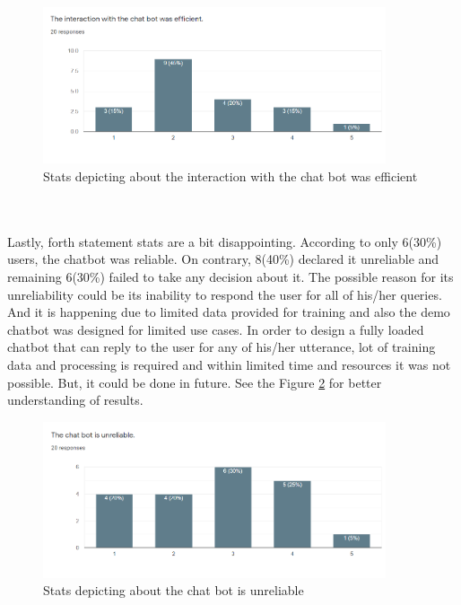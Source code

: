 \begin{figure}[!h]
    \centering
    \includegraphics[width=0.9\textwidth]{img/Efficient_Inter.PNG}
    \caption{Stats depicting about the interaction with the chat bot was efficient}
    \label{fig:effInt}
\end{figure}
\\~\\
Lastly, forth statement stats are a bit disappointing. According to only 6(30\%) users, the chatbot was reliable. On contrary, 8(40\%) declared it unreliable and remaining 6(30\%) failed to take any decision about it. The possible reason for its unreliability could be its inability to respond the user for all of his/her queries. And it is happening due to limited data provided for training and also the demo chatbot was designed for limited use cases. In order to design a fully loaded chatbot that can reply to the user for any of his/her utterance, lot of training data and processing is required and within limited time and resources it was not possible. But, it could be done in future. See the Figure \ref{fig:unreliBot} for better understanding of results.

\begin{figure}[!h]
    \centering
    \includegraphics[width=0.9\textwidth]{img/Unreli_Bot.PNG}
    \caption{Stats depicting about the chat bot is unreliable}
    \label{fig:unreliBot}
\end{figure}

